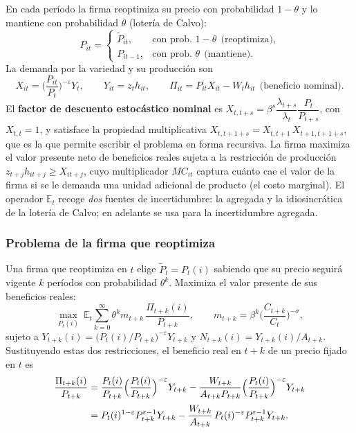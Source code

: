 \documentclass[11pt]{article}
\theoremstyle{definition}
\newcommand{\E}{\mathbb{E}}
\begin{document}
En cada período la firma reoptimiza su precio con probabilidad $1-\theta$ y lo mantiene con
probabilidad $\theta$ (lotería de Calvo):
\begin{equation}
P_{it}=
\begin{cases}
\widetilde{P}_{it}, & \text{con prob.\ }1-\theta\ \ \text{(reoptimiza),}\\[3pt]
P_{it-1}, & \text{con prob.\ }\theta\ \ \text{(mantiene).}
\end{cases}
\end{equation}
La demanda por la variedad y su producción son
\begin{equation}
X_{it}=\Big(\frac{P_{it}}{P_{t}}\Big)^{-\varepsilon}Y_{t},
\qquad Y_{it}=z_{t}h_{it},
\qquad \Pi_{it}=P_{it}X_{it}-W_{t}h_{it}\ \ \text{(beneficio nominal).}
\end{equation}
El \textbf{factor de descuento estocástico nominal} es
$X_{t,t+s}=\beta^{s}\dfrac{\lambda_{t+s}}{\lambda_{t}}\dfrac{P_{t}}{P_{t+s}}$, con $X_{t,t}=1$, y satisface
la propiedad multiplicativa $X_{t,t+1+s}=X_{t,t+1}\,X_{t+1,t+1+s}$, que es la que permite escribir el
problema en forma recursiva. La firma maximiza el valor presente neto de beneficios reales sujeta a la
restricción de producción $z_{t+j}h_{it+j}\ge X_{it+j}$, cuyo multiplicador $MC_{it}$ captura cuánto cae
el valor de la firma si se le demanda una unidad adicional de producto (el costo marginal). El operador
$\E_{t}$ recoge \emph{dos} fuentes de incertidumbre: la agregada y la idiosincrática de la lotería de
Calvo; en adelante se usa para la incertidumbre agregada.

\subsubsection{Problema de la firma que reoptimiza}

Una firma que reoptimiza en $t$ elige $\widetilde{P}_{t}=P_{t}(i)$ sabiendo que su precio seguirá
vigente $k$ períodos con probabilidad $\theta^{k}$. Maximiza el valor presente de sus beneficios
reales:
\begin{equation}
\max_{P_{t}(i)}\ \E_{t}\sum_{k=0}^{\infty}\theta^{k}m_{t+k}\,\frac{\Pi_{t+k}(i)}{P_{t+k}},
\qquad m_{t+k}=\beta^{k}\Big(\frac{C_{t+k}}{C_{t}}\Big)^{-\sigma},
\end{equation}
sujeto a $Y_{t+k}(i)=\big(P_{t}(i)/P_{t+k}\big)^{-\varepsilon}Y_{t+k}$ y $N_{t+k}(i)=Y_{t+k}(i)/A_{t+k}$.
Sustituyendo estas dos restricciones, el beneficio real en $t+k$ de un precio fijado en $t$ es
\begin{align}
\frac{\Pi_{t+k}(i)}{P_{t+k}}
&=\frac{P_{t}(i)}{P_{t+k}}\Big(\frac{P_{t}(i)}{P_{t+k}}\Big)^{-\varepsilon}Y_{t+k}
-\frac{W_{t+k}}{A_{t+k}P_{t+k}}\Big(\frac{P_{t}(i)}{P_{t+k}}\Big)^{-\varepsilon}Y_{t+k} \notag\\[2pt]
&=P_{t}(i)^{1-\varepsilon}P_{t+k}^{\varepsilon-1}Y_{t+k}
-\frac{W_{t+k}}{A_{t+k}}\,P_{t}(i)^{-\varepsilon}P_{t+k}^{\varepsilon-1}Y_{t+k}.
\end{align}
\end{document}

